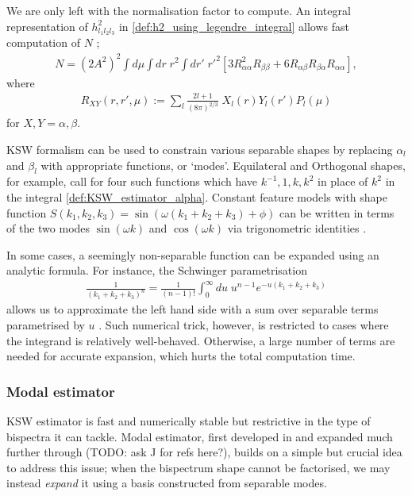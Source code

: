 We are only left with the normalisation factor to compute. An integral representation of $h^2_{l_1 l_2 l_3}$ in \eqref{def:h2_using_legendre_integral} allows fast computation of $N$ \cite{Smith2011};
\begin{align}
	N = (2A^2)^2 \int d\mu \int dr \;r^2 \int dr' \; r'^2 \left[ 3R_{\alpha\alpha}^2 R_{\beta\beta} + 6R_{\alpha\beta} R_{\beta\alpha} R_{\alpha\alpha} \right],
\end{align}
where
\begin{align}
	R_{XY} (r,r',\mu) := \sum_l \frac{2l+1}{(8\pi)^{2/3}} \; X_l (r) Y_l (r') P_l(\mu)
\end{align}
for $X,Y=\alpha,\beta$.

KSW formalism can be used to constrain various separable shapes by replacing $\alpha_l$ and $\beta_l$ with appropriate functions, or `modes'. Equilateral and Orthogonal shapes, for example, call for four such functions which have $k^{-1}, 1, k, k^2$ in place of $k^2$ in the integral \eqref{def:KSW_estimator_alpha}. Constant feature models with shape function $S(k_1,k_2,k_3) = \sin(\omega(k_1+k_2+k_3)+\phi)$ can be written in terms of the two modes $\sin(\omega k)$ and $\cos(\omega k)$ via trigonometric identities \cite{Munchmeyer2014}.

In some cases, a seemingly non-separable function can be expanded using an analytic formula. For instance, the Schwinger parametrisation
\begin{align}
	\frac{1}{(k_1+k_2+k_3)^n} = \frac{1}{(n-1)!} \int_0^{\infty} du \; u^{n-1} e^{-u(k_1+k_2+k_3)}
\end{align}
allows us to approximate the left hand side with a sum over separable terms parametrised by $u$ \cite{Smith2011}. Such numerical trick, however, is restricted to cases where the integrand is relatively well-behaved. Otherwise, a large number of terms are needed for accurate expansion, which hurts the total computation time.

\subsubsection*{Modal estimator}
KSW estimator is fast and numerically stable but restrictive in the type of bispectra it can tackle. Modal estimator, first developed in \cite{Fergusson2010general} and expanded much further through \cite{Fergusson2012,Fergusson2014,Shiraishi2014parityodd,Shiraishi2019cross} (TODO: ask J for refs here?), builds on a simple but crucial idea to address this issue; when the bispectrum shape cannot be factorised, we may instead \textit{expand} it using a basis constructed from separable modes.

